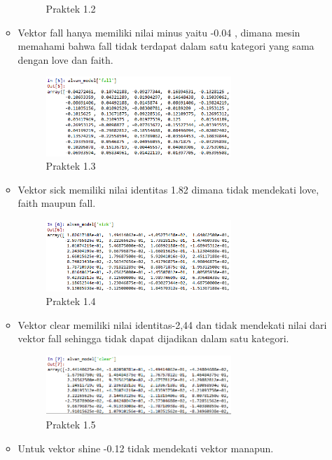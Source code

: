 \begin{enumerate}
\begin{itemize}
\begin{figure}[H]
			\centering
			\caption{Praktek 1.2}
		\end{figure}
		\item Vektor fall hanya memiliki nilai minus yaitu -0.04 , dimana mesin memahami bahwa fall tidak terdapat dalam satu kategori yang sama dengan love dan faith.
		\hfill\break
		
		\begin{figure}[H]
			\includegraphics[width=7cm]{figures/1174077/5/p4.png}
			\centering
			\caption{Praktek 1.3}
		\end{figure}
		\item Vektor sick memiliki nilai identitas 1.82 dimana tidak mendekati love, faith maupun fall.
		\hfill\break
		
		\begin{figure}[H]
			\includegraphics[width=7cm]{figures/1174077/5/p5.png}
			\centering
			\caption{Praktek 1.4}
		\end{figure}
		\item Vektor clear memiliki nilai identitas-2,44 dan tidak mendekati nilai dari vektor fall sehingga tidak dapat dijadikan dalam satu kategori.
		\hfill\break
		
		\begin{figure}[H]
			\includegraphics[width=7cm]{figures/1174077/5/p6.png}
			\centering
			\caption{Praktek 1.5}
		\end{figure}
		\item Untuk vektor shine -0.12 tidak mendekati vektor manapun. 
		\hfill\break
		

\end{itemize}
\end{enumerate}
